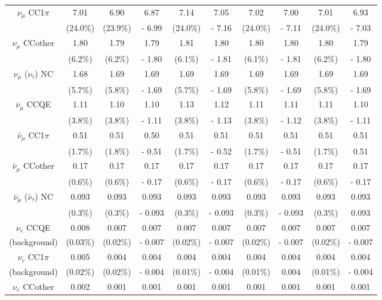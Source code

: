 \begin{table}
\begin{tabular}{| c | c | c | c | c | c | c | c | c | c |}
\hline
$\nu_{\mu}$ CC1$\pi$ & 7.01 &  6.90 & 6.87 & 7.14 & 7.05 & 7.02 & 7.00 & 7.01 & 6.93 \\
 & (24.0\%) & (23.9\%) & - 6.99 & (24.0\%) & - 7.16 & (24.0\%) & - 7.11 & (24.0\%) & - 7.03 \\
\hline
$\nu_{\mu}$ CCother & 1.80 & 1.79  & 1.79 &  1.81 & 1.80 & 1.80 & 1.80 & 1.80 & 1.79 \\
 & (6.2\%) & (6.2\%)  & - 1.80 &  (6.1\%) & - 1.81 &  (6.1\%) & - 1.81 &  (6.2\%) & - 1.80 \\
\hline
$\nu_{\mu}$ ($\nu_{\tau}$) NC & 1.68 & 1.69 & 1.69 & 1.69 & 1.69 & 1.69 & 1.69 & 1.69 & 1.69 \\
 & (5.7\%) & (5.8\%) & - 1.69 &  (5.7\%) & - 1.69 &  (5.8\%) & - 1.69 &  (5.8\%) & - 1.69 \\
\hline
$\bar{\nu}_{\mu}$ CCQE & 1.11 &  1.10 & 1.10 &  1.13 & 1.12 & 1.11 & 1.11 & 1.11 & 1.10 \\
 & (3.8\%) &  (3.8\%) & - 1.11 &  (3.8\%) & - 1.13 &  (3.8\%) & - 1.12 &  (3.8\%) & - 1.11 \\
\hline
$\bar{\nu}_{\mu}$ CC1$\pi$ & 0.51 &  0.51 & 0.50 &  0.51 & 0.51 & 0.51 & 0.51 & 0.51 & 0.51 \\
 & (1.7\%) &  (1.8\%) & - 0.51 &  (1.7\%) & - 0.52 &  (1.7\%) & - 0.51 &  (1.7\%) & 0.51 \\
\hline
$\bar{\nu}_{\mu}$ CCother & 0.17 &  0.17 & 0.17 & 0.17 & 0.17 & 0.17 & 0.17 & 0.17 & 0.17 \\
 & (0.6\%) &  (0.6\%) & - 0.17 &  (0.6\%) & - 0.17 &  (0.6\%) & - 0.17 &  (0.6\%) & - 0.17 \\
\hline
$\bar{\nu}_{\mu}$ ($\bar{\nu}_{\tau}$) NC & 0.093 & 0.093 & 0.093 &  0.093 & 0.093 & 0.093 & 0.093 & 0.093 & 0.093 \\
 & (0.3\%) & (0.3\%) & - 0.093 &  (0.3\%) & - 0.093 &  (0.3\%) & - 0.093 &  (0.3\%) & 0.093 \\
\hline
$\nu_{e}$ CCQE & 0.008 &  0.007 & 0.007 & 0.007 & 0.007 & 0.007 & 0.007 & 0.007 & 0.007 \\
(background) & (0.03\%) &  (0.02\%) & - 0.007 & (0.02\%) & - 0.007 &  (0.02\%) & - 0.007 &  (0.02\%) & - 0.007 \\
\hline
$\nu_{e}$ CC1$\pi$ & 0.005 & 0.004 & 0.004 &  0.004 & 0.004 & 0.004 & 0.004 & 0.004 & 0.004 \\
(background) & (0.02\%) & (0.02\%) & - 0.004 & (0.01\%) & - 0.004 & (0.01\%)  & 0.004 & (0.01\%) & - 0.004 \\
\hline
$\nu_{e}$ CCother & 0.002 &  0.001 & 0.001 & 0.001 & 0.001 & 0.001 & 0.001 & 0.001 & 0.001 \\

\end{tabular}
\end{table}
